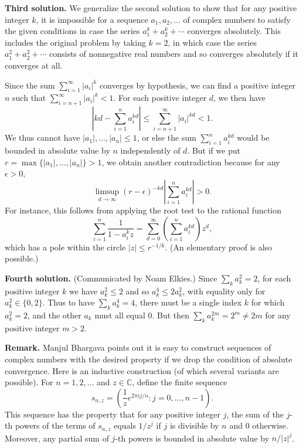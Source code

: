 \documentclass[amssymb,twocolumn,pra,10pt,aps]{revtex4-1}
\newcommand{\CC}{\mathbb{C}}
\begin{document}
\begin{itemize}
\textbf{Third solution.}
We generalize the second solution to show that for any positive integer $k$, it is impossible for a sequence
$a_1, a_2,\dots$ of complex numbers to satisfy the given conditions in case
the series $a_1^k + a_2^k + \cdots$ converges absolutely. This includes the original problem by taking
$k=2$, in which case the series $a_1^2 + a_2^2 + \cdots$ consists of nonnegative
real numbers and so converges absolutely if it converges at all.

Since the sum $\sum_{i=1}^\infty |a_i|^k$ converges by hypothesis, we can find a positive integer $n$
such that $\sum_{i=n+1}^\infty |a_i|^k < 1$. For each positive integer $d$, we then have
\[
\left|kd - \sum_{i=1}^n a_i^{kd} \right|
\leq \sum_{i=n+1}^\infty |a_i|^{kd} < 1.
\]
We thus cannot have $|a_1|,\dots,|a_n| \leq 1$, or else the sum $\sum_{i=1}^n a_i^{kd}$ would be bounded
in absolute value by $n$ independently of $d$. But if we put $r = \max\{|a_1|,\dots,|a_n|\} > 1$, we
obtain another contradiction because for any $\epsilon > 0$,
\[
\limsup_{d \to \infty} (r-\epsilon)^{-kd} \left| \sum_{i=1}^n a_i^{kd} \right| > 0.
\]
For instance, this follows from applying the root test to the rational function
\[
\sum_{i=1}^n \frac{1}{1 - a_i^k z} = \sum_{d=0}^\infty \left( \sum_{i=1}^n a_i^{kd} \right) z^d,
\]
which has a pole within the circle $|z| \leq r^{-1/k}$.
(An elementary proof is also possible.)

\textbf{Fourth solution.}
(Communicated by Noam Elkies.)
Since $\sum_k a_k^2 = 2$, for each positive integer $k$ we have $a_k^2 \leq 2$ and so $a_k^4 \leq 2 a_k^2$,
with equality only for $a_k^2 \in \{0,2\}$. Thus to have $\sum_k a_k^4 = 4$, there must be a single index
$k$ for which $a_k^2 = 2$, and the other $a_k$ must all equal 0. But then $\sum_k a_k^{2m} = 2^m \neq 2m$
for any positive integer $m>2$.

\textbf{Remark.} Manjul Bhargava points out it is easy to construct sequences of complex numbers with the
desired property if we drop the condition of absolute convergence. Here is an inductive construction
(of which several variants are possible).
For $n=1,2,\dots$ and $z \in \CC$, define the finite sequence
\[
s_{n,z} = \left( \frac{1}{z} e^{2 \pi i j/n}: j = 0, \dots, n-1 \right).
\]
This sequence has the property that for any positive integer $j$, the sum of the $j$-th powers
of the terms of $s_{n,z}$ equals $1/z^{j}$ if $j$ is divisible by $n$ and 0 otherwise.
Moreover, any partial sum of $j$-th powers is bounded in absolute value by $n/|z|^j$.


\end{itemize}
\end{document}
